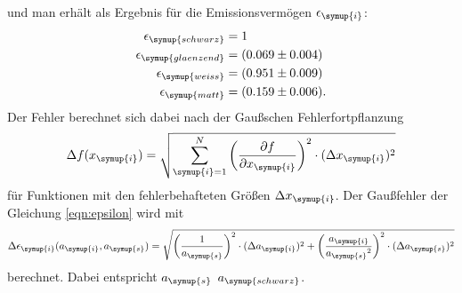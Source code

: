 und man erhält als Ergebnis für die Emissionsvermögen $\epsilon_\symup{i}$:
\begin{align*}
  \epsilon_\symup{schwarz}   &= 1 \\
  \epsilon_\symup{glaenzend} &= (0.069\pm0.004) \\
  \epsilon_\symup{weiss}     &= (0.951\pm0.009) \\
  \epsilon_\symup{matt}      &= (0.159\pm0.006).
\end{align*}
Der Fehler berechnet sich dabei nach der Gaußschen Fehlerfortpflanzung
\begin{equation}
  \Delta f(x_\symup{i}) = \sqrt{\sum_{\symup{i}=1}^N
  \left(\frac{\partial f}{\partial x_\symup{i}}\right)^2 \cdot
  (\Delta x_\symup{i})^2}
  \label{eqn:gaussfehler-allgemein}
\end{equation}
für Funktionen mit den fehlerbehafteten Größen $\Delta x_\symup{i}$.
Der Gaußfehler der Gleichung \eqref{eqn:epsilon} wird mit
\begin{equation}
  \Delta \epsilon_\symup{i}(a_\symup{i},a_\symup{s}) =
  \sqrt{\left(\frac{1}{a_\symup{s}}\right)^2\cdot(\Delta a_\symup{i})^2
  + \left(\frac{a_\symup{i}}{{a_\symup{s}}^2}\right)^2
  \cdot(\Delta a_\symup{s})^2}
  \label{eqn:gaussfehler-epsilon}
\end{equation}
berechnet. Dabei entspricht $a_\symup{s}$ $a_\symup{schwarz}$.

